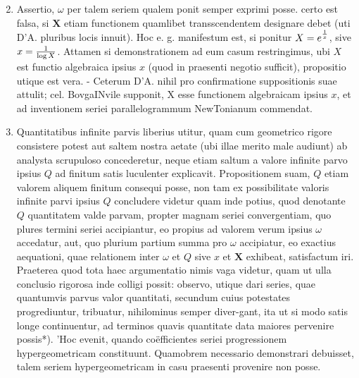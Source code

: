 \documentclass[twoside,12pt, showframe]{memoir}
\let\oldfrac\frac
\def\frac#1#2{\mathchoice{\tfrac{#1}{#2}}{\oldfrac{#1}{#2}}{\genfrac{}{}{}{2}{#1}{#2\mathstrut}}{\genfrac{}{}{}{3}{#1}{#2\mathstrut}}}
\begin{document}
\begin{enumerate}
  \setcounter{enumi}{1}
  \item Assertio, \(\omega\) per talem seriem qualem ponit semper exprimi posse. certo est falsa, si \(\mathbf{X}\) etiam functionem quamlibet transscendentem designare debet (uti D'A. pluribus locis innuit). Hoc e. g. manifestum est, si ponitur \(X=e^{\frac{1}{x}}\), sive \(x=\frac{1}{\log X}\). Attamen si demonstrationem ad eum casum restringimus, ubi \(X\) est functio algebraica ipsius \(x\) (quod in praesenti negotio sufficit), propositio utique est vera. - Ceterum D'A. nihil pro confirmatione suppositionis suae attulit; cel. BovgaINvile supponit, \(\mathrm{X}\) esse functionem algebraicam ipsius \(x\), et ad inventionem seriei parallelogrammum NewTonianum commendat.

  \item Quantitatibus infinite parvis liberius utitur, quam cum geometrico rigore consistere potest aut saltem nostra aetate (ubi illae merito male audiunt) ab analysta scrupuloso concederetur, neque etiam saltum a valore infinite parvo ipsius \(Q\) ad finitum satis luculenter explicavit. Propositionem suam, \(Q\) etiam valorem aliquem finitum consequi posse, non tam ex possibilitate valoris infinite parvi ipsius \(Q\) concludere videtur quam inde potius, quod denotante \(Q\) quantitatem valde parvam, propter magnam seriei convergentiam, quo plures termini seriei accipiantur, eo propius ad valorem verum ipsius \(\omega\) accedatur, aut, quo plurium partium summa pro \(\omega\) accipiatur, eo exactius aequationi, quae relationem inter \(\omega\) et \(Q\) sive \(x\) et \(\boldsymbol{X}\) exhibeat, satisfactum iri. Praeterea quod tota haec argumentatio nimis vaga videtur, quam ut ulla conclusio rigorosa inde colligi possit: observo, utique dari series, quae quantumvis parvus valor quantitati,
secundum cuius potestates progrediuntur, tribuatur, nihilominus semper diver-gant, ita ut si modo satis longe continuentur, ad terminos quavis quantitate data maiores pervenire possis*). 'Hoc evenit, quando coëfficientes seriei progressionem hypergeometricam constituunt. Quamobrem necessario demonstrari debuisset, talem seriem hypergeometricam in casu praesenti provenire non posse.

\end{enumerate}
\end{document}
